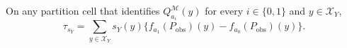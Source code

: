 On any partition cell that identifies \(Q_{a_i}^{\mathcal M}(y)\) for every \(i\in\{0,1\}\) and \(y\in\mathcal X_Y\),
\[
\tau_{s_Y}=\sum_{y\in\mathcal X_Y}s_Y(y)\{f_{a_1}(P_{\mathrm{obs}})(y)-f_{a_0}(P_{\mathrm{obs}})(y)\}.
\]